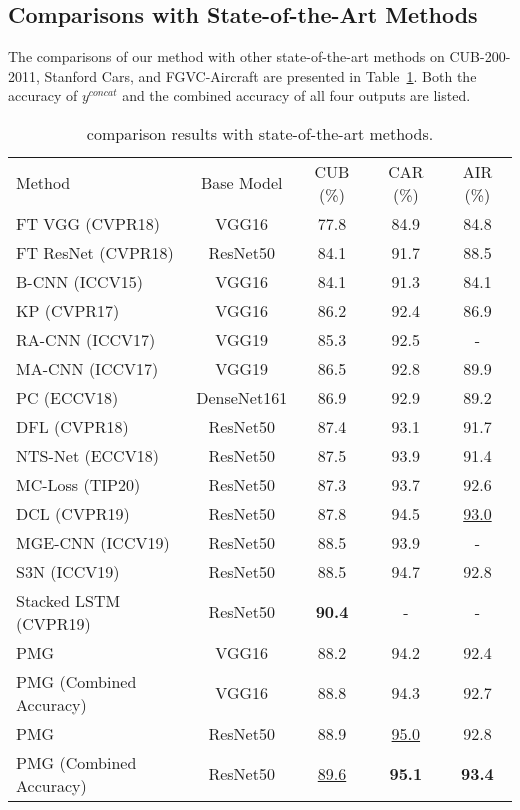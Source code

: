 \documentclass{llncs}
\begin{document}
\subsection{Comparisons with State-of-the-Art Methods}\label{ssec:sota}
The comparisons of our method with other state-of-the-art methods on CUB-200-2011, Stanford Cars, and FGVC-Aircraft are presented in Table~\ref{table:comparison}. Both the accuracy of ${y}^{concat}$ and the combined accuracy of all four outputs are listed.

\setlength{\tabcolsep}{4pt}
\begin{table}[!t]
\begin{center}
\caption{comparison results with state-of-the-art methods.}
\label{table:comparison}
\begin{tabular}{lcccc}
\hline\noalign{\smallskip}
Method & Base Model & CUB (\%) & CAR (\%) & AIR (\%)\\
\noalign{\smallskip}
\hline
\noalign{\smallskip}
FT VGG (CVPR18) \cite{wang2018learning} & VGG16 & 77.8 & 84.9 & 84.8\\
FT ResNet (CVPR18) \cite{wang2018learning} & ResNet50 & 84.1 & 91.7 & 88.5\\
B-CNN (ICCV15) \cite{lin2015bilinear} & VGG16 & 84.1 & 91.3 & 84.1\\
KP (CVPR17) \cite{cui2017kernel} & VGG16 & 86.2 & 92.4 & 86.9\\
RA-CNN (ICCV17) \cite{fu2017look} & VGG19 & 85.3 & 92.5 & -\\
MA-CNN (ICCV17) \cite{zheng2017learning} & VGG19 & 86.5 & 92.8 & 89.9\\
PC (ECCV18) \cite{dubey2018pairwise} & DenseNet161 & 86.9 & 92.9 & 89.2\\
DFL (CVPR18) \cite{wang2018learning} & ResNet50 & 87.4 & 93.1 & 91.7\\
NTS-Net (ECCV18) \cite{yang2018learning} & ResNet50 & 87.5 & 93.9 & 91.4\\
MC-Loss (TIP20) \cite{chang2019the} & ResNet50 & 87.3 & 93.7 & 92.6\\
DCL (CVPR19) \cite{chen2019destruction} & ResNet50 & 87.8 & 94.5 & \underline{93.0}\\
MGE-CNN (ICCV19) \cite{zhang2019learning} & ResNet50 & 88.5 & 93.9 & -\\
S3N (ICCV19) \cite{ding2019selective} & ResNet50 & 88.5 & 94.7 & 92.8\\
Stacked LSTM (CVPR19) \cite{ge2019weakly} & ResNet50 & {\bf 90.4} & - & -\\
\hline
PMG & VGG16 & 88.2 & 94.2 & 92.4\\
PMG (Combined Accuracy) & VGG16 & 88.8 & 94.3 & 92.7\\
PMG & ResNet50 & 88.9 & \underline{95.0} & 92.8\\
PMG (Combined Accuracy) & ResNet50 & \underline{89.6} & {\bf 95.1} & {\bf 93.4}\\
\hline
\end{tabular}
\end{center}
\end{table}
\setlength{\tabcolsep}{1.4pt}
\end{document}
